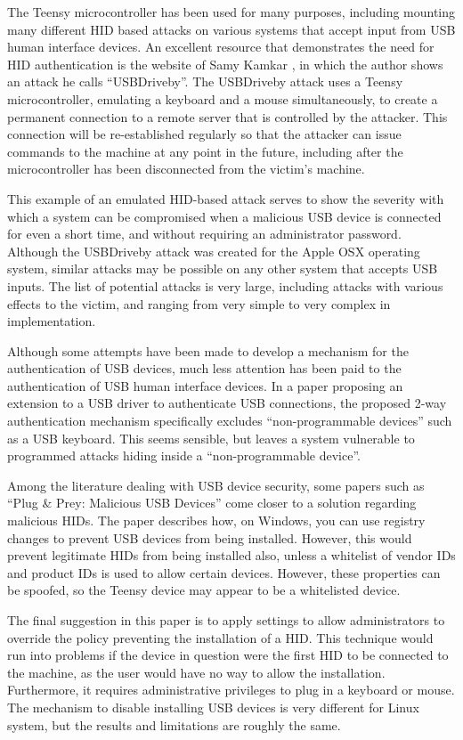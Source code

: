\documentclass{ieee}
\begin{document}
The Teensy microcontroller has been used for many purposes, including mounting many different HID based attacks on various systems that accept input from USB human interface devices. An excellent resource that demonstrates the need for HID authentication is the website of Samy Kamkar \cite{samy}, in which the author shows an attack he calls ``USBDriveby''. The USBDriveby attack uses a Teensy microcontroller, emulating a keyboard and a mouse simultaneously,  to create a permanent connection to a remote server that is controlled by the attacker.  This connection will be re-established regularly so that the attacker can issue commands to the machine at any point in the future, including after the microcontroller has been disconnected from the victim's machine.

This example of an emulated HID-based attack serves to show the severity with which a system can be compromised when a malicious USB device is connected for even a short time, and without requiring an administrator password. Although the USBDriveby attack was created for the Apple OSX operating system, similar attacks may be possible on any other system that accepts USB inputs. The list of potential attacks is very large, including attacks with various effects to the victim, and ranging from very simple to very complex in implementation.

Although some attempts have been made to develop a mechanism for the authentication of USB devices, much less attention has been paid to the authentication of USB human interface devices. In a paper \cite{wang} proposing an extension to a USB driver to authenticate USB connections, the proposed 2-way authentication mechanism specifically excludes ``non-programmable devices'' such as a USB keyboard. This seems sensible, but leaves a system vulnerable to programmed attacks hiding inside a ``non-programmable device''.

Among the literature dealing with USB device security, some papers such as ``Plug \& Prey: Malicious USB Devices'' come closer to a solution regarding malicious HIDs. The paper describes how, on Windows, you can use registry changes to prevent USB devices from being installed. However, this would prevent legitimate HIDs from being installed also, unless a whitelist of vendor IDs and product IDs is used to allow certain devices. However, these properties can be spoofed, so the Teensy device may appear to be a whitelisted device.

The final suggestion in this paper is to apply settings to allow administrators to override the policy preventing the installation of a HID. This technique would run into problems if the device in question were the first HID to be connected to the machine, as the user would have no way to allow the installation. Furthermore, it requires administrative privileges to plug in a keyboard or mouse. The mechanism to disable installing USB devices is very different for Linux system, but the results and limitations are roughly the same.
\end{document}
